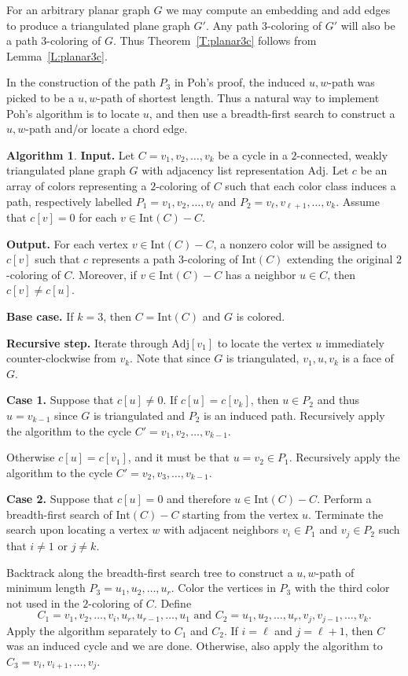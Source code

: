 \documentclass[12pt,letterpaper]{article}
\theoremstyle{plain}
\theoremstyle{definition}
\theoremstyle{break}
\newtheorem{algorithm}[lemma]{Algorithm}     %
\begin{document}
For an arbitrary planar graph $G$ we may compute an embedding and add edges
to produce a triangulated plane graph $G'$. Any path $3$-coloring of
$G'$ will also be a path $3$-coloring of $G$. Thus Theorem~\ref{T:planar3c}
follows from Lemma~\ref{L:planar3c}.

In the construction of the path $P_3$ in Poh's proof, the
induced $u,w$-path was picked to be a $u,w$-path of shortest length.
Thus a natural way to implement Poh's algorithm is to locate $u$,
and then use a breadth-first search
to construct a $u,w$-path and/or locate
a chord edge.

\begin{algorithm}\label{A:poh_bfs}
\textbf{Input.} Let $C=v_1,v_2,\ldots,v_k$ be a cycle in a $2$-connected,
weakly triangulated plane
graph $G$ with adjacency list representation $\text{Adj}$. Let 
$c$ be an array of colors representing a $2$-coloring of $C$ such
that each color class induces a path, respectively labelled
$P_1=v_1,v_2,\ldots,v_\ell$ and $P_2=v_\ell,v_{\ell+1},\ldots,v_k$. Assume that
$c[v]=0$ for each $v\in\text{Int}(C)-C$.

\textbf{Output.} For each vertex $v\in\text{Int}(C)-C$, a nonzero color will be
assigned to $c[v]$ such that $c$ represents a path $3$-coloring of
$\text{Int}(C)$ extending the original $2$-coloring of $C$. Moreover, if
$v\in \text{Int}(C)-C$ has a neighbor $u\in C$, then $c[v]\ne c[u]$.

\textbf{Base case.} If $k=3$, then $C=\text{Int}(C)$ and $G$ is colored.

\textbf{Recursive step.} Iterate through $\text{Adj}[v_1]$ to locate the vertex $u$
immediately counter-clockwise from $v_k$. Note that since $G$ is triangulated,
$v_1,u,v_k$ is a face of $G$.

\textbf{Case 1.} Suppose that $c[u]\ne 0$. If $c[u]=c[v_k]$,
then $u\in P_2$ and
thus $u=v_{k-1}$ since $G$ is
triangulated and $P_2$ is an induced path. Recursively
apply the algorithm to the cycle $C'=v_1,v_2,\ldots,v_{k-1}$.

Otherwise $c[u]=c[v_1]$, and it must be that $u=v_2\in P_1$. Recursively
apply the algorithm to the cycle $C'=v_2,v_3,\ldots,v_{k-1}$.

\textbf{Case 2.} Suppose that $c[u]=0$ and therefore $u\in \text{Int}(C)-C$.
Perform a breadth-first search of $\text{Int}(C)-C$ starting from the
vertex $u$. Terminate the search upon locating a vertex $w$ with
adjacent
neighbors $v_i\in P_1$ and $v_j\in P_2$ such that $i\ne 1$ or $j\ne k$.

Backtrack along the breadth-first search tree
to construct a $u,w$-path of minimum length $P_3=u_1,u_2,\ldots,u_r$.
Color the vertices in
$P_3$ with the third color not used in the $2$-coloring of $C$.
Define
$$C_1=v_1,v_2,\ldots,v_i,u_r,u_{r-1},\ldots,u_1 \text{ and }
C_2=u_1,u_2,\ldots,u_r,v_j,v_{j-1},\ldots,v_k.$$
Apply the algorithm
separately to $C_1$ and $C_2$. If $i=\ell$ and $j={\ell+1}$, then $C$ was an
induced cycle and we are done. Otherwise, also apply the algorithm to
$C_3=v_i,v_{i+1},\ldots,v_j$.
\end{algorithm}
\end{document}
